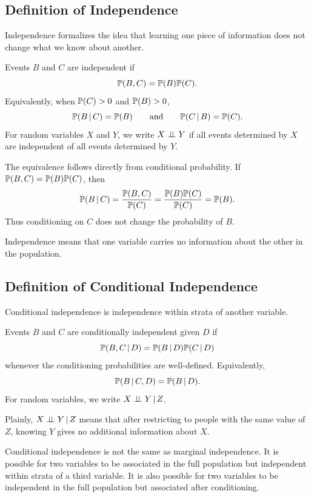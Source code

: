 \label{lec:1-4}

\subsection{Definition of Independence}

Independence formalizes the idea that learning one piece of information does not change what we know about another.

\begin{definition}[Independence]
Events $B$ and $C$ are independent if
\[
\mathbb{P}(B,C)=\mathbb{P}(B)\mathbb{P}(C).
\]
Equivalently, when $\mathbb{P}(C)>0$ and $\mathbb{P}(B)>0$,
\[
\mathbb{P}(B\,\vert\, C)=\mathbb{P}(B)
\qquad\text{and}\qquad
\mathbb{P}(C\,\vert\, B)=\mathbb{P}(C).
\]
For random variables $X$ and $Y$, we write $X\perp\!\!\!\perp Y$ if all events determined by $X$ are independent of all events determined by $Y$.
\end{definition}

The equivalence follows directly from conditional probability. If $\mathbb{P}(B,C)=\mathbb{P}(B)\mathbb{P}(C)$, then
\[
\mathbb{P}(B\,\vert\, C)=\frac{\mathbb{P}(B,C)}{\mathbb{P}(C)}
=\frac{\mathbb{P}(B)\mathbb{P}(C)}{\mathbb{P}(C)}
=\mathbb{P}(B).
\]
Thus conditioning on $C$ does not change the probability of $B$.

\begin{keyidea}
Independence means that one variable carries no information about the other in the population.
\end{keyidea}

\subsection{Definition of Conditional Independence}

Conditional independence is independence within strata of another variable.

\begin{definition}
Events $B$ and $C$ are conditionally independent given $D$ if
\[
\mathbb{P}(B,C\,\vert\, D)=\mathbb{P}(B\,\vert\, D)\mathbb{P}(C\,\vert\, D)
\]
whenever the conditioning probabilities are well-defined. Equivalently,
\[
\mathbb{P}(B\,\vert\, C,D)=\mathbb{P}(B\,\vert\, D).
\]
For random variables, we write $X\perp\!\!\!\perp Y\,\vert\, Z$.
\end{definition}

Plainly, $X\perp\!\!\!\perp Y\,\vert\, Z$ means that after restricting to people with the same value of $Z$, knowing $Y$ gives no additional information about $X$.

Conditional independence is not the same as marginal independence. It is possible for two variables to be associated in the full population but independent within strata of a third variable. It is also possible for two variables to be independent in the full population but associated after conditioning.

